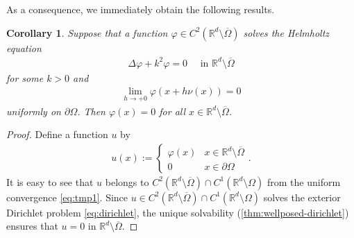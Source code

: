 \documentclass{article}
\theoremstyle{plain}
\newtheorem{cor}[thm]{Corollary}
\theoremstyle{definition}
\begin{document}
As a consequence, we immediately obtain the following results.
\begin{cor}
    Suppose that a function $\varphi\in C^2(\mathbb R^d\setminus\overline\Omega)$ solves the Helmholtz equation
    \begin{align*}
        \varDelta \varphi + k^2 \varphi  = 0 \quad\text{ in }\mathbb R^d\setminus\overline\Omega
    \end{align*}
    for some $k>0$ and 
    \begin{align}\label{eq:tmp1}
        \lim_{h\to+0} \varphi (x+h\nu(x)) = 0 
    \end{align}
    uniformly on $\partial\Omega$. Then $\varphi (x)=0$ for all $x\in \mathbb R^d\setminus\overline\Omega$.
\end{cor}
\begin{proof}
    Define a function $u$ by
    \begin{align*}
        u(x) :=
        \begin{cases}
            \varphi(x) & x\in \mathbb R^d\setminus\overline\Omega
            \\
            0 & x\in \partial\Omega
        \end{cases}
        .
    \end{align*}
    It is easy to see that $u$ belongs to $C^2(\mathbb R^d\setminus\overline\Omega) \cap C^1(\mathbb R^d\setminus\Omega)$ from the uniform convergence \cref{eq:tmp1}. Since $u\in C^2(\mathbb R^d\setminus\overline\Omega) \cap C^1(\mathbb R^d\setminus\Omega)$ solves the exterior Dirichlet problem \cref{eq:dirichlet}, the unique solvability (\cref{thm:wellposed-dirichlet}) ensures that $u=0$ in $\mathbb R^d\setminus\overline\Omega$.
\end{proof}
\end{document}
